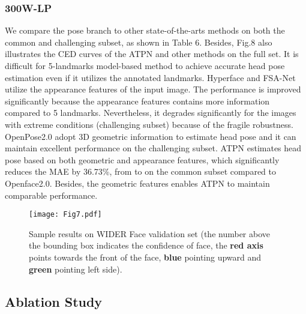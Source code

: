 \documentclass[3p,twocolumn, round, sort & compress]{elsarticle}
\begin{document}
\subsubsection{300W-LP}
We compare the pose branch to other state-of-the-arts methods on both the common and challenging subset, as shown in Table 6. Besides, Fig.8 also illustrates the CED curves of the ATPN and other methods on the full set. It is difficult for 5-landmarks model-based method to achieve accurate head pose estimation even if it utilizes the annotated landmarks. Hyperface and FSA-Net utilize the appearance features of the input image. The performance is improved significantly because the appearance features contains more information compared to 5 landmarks. Nevertheless, it degrades significantly for the images with extreme conditions (challenging subset) because of the fragile robustness. OpenPose2.0 adopt 3D geometric information to estimate head pose and it can maintain excellent performance on the challenging subset. ATPN estimates head pose based on both geometric and appearance features, which significantly reduces the MAE by 36.73\%, from  to  on the common subset compared to Openface2.0. Besides, the geometric features enables ATPN to maintain comparable performance. 



\begin{figure*}[t!]
	\centering
	\texttt{[image: Fig7.pdf]}
	\caption{Sample results on WIDER Face validation set (the number above the bounding box indicates the confidence of face, the {\color{red} \textbf{red axis}} points towards the front of the face, {\color{blue} \textbf{blue}} pointing upward and {\color{green} \textbf{green}} pointing left side).}
	\label{fig7}
\end{figure*}

\subsection{Ablation Study}
\end{document}

